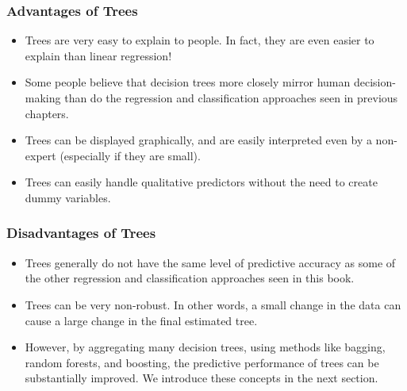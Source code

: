 \documentclass{beamer}
\begin{document}
                 \begin{frame}
                 	\frametitle{Advantages of Trees  }
                 	\begin{itemize}
                 	 
                 	\item  Trees are very easy to explain to people. In fact, they are even easier
                 	to explain than linear regression!
                 	\item Some people believe that decision trees more closely mirror human
                 	decision-making than do the regression and classification approaches
                 	seen in previous chapters.
                 	\item Trees can be displayed graphically, and are easily interpreted even by
                 	a non-expert (especially if they are small).
                 	\item Trees can easily handle qualitative predictors without the need to
                 	create dummy variables.
                  
                 	 	\end{itemize}
                 	 \end{frame} 
                 	 
                 	 \begin{frame}
                 	 	\frametitle{Disadvantages of Trees  }
                 	 	\begin{itemize}
                 	 		
                 	\item Trees generally do not have the same level of predictive
                 	accuracy as some of the other regression and classification approaches
                 	seen in this book.
                 	\item Trees can be very non-robust. In other words, a small
                 	change in the data can cause a large change in the final estimated
                 	tree.
                 	
                 \item 	
                 	However, by aggregating many decision trees, using methods like bagging,
                 	random forests, and boosting, the predictive performance of trees can be
                 	substantially improved. We introduce these concepts in the next section.
                 	  
                 	\end{itemize}
                 \end{frame} 
                 
\end{document}

